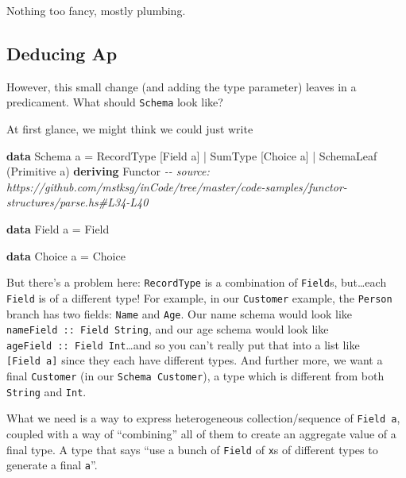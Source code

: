 \documentclass[]{article}
\newenvironment{Shaded}{}{}
\newcommand{\CommentTok}[1]{\textcolor[rgb]{0.38,0.63,0.69}{\textit{#1}}}
\newcommand{\DataTypeTok}[1]{\textcolor[rgb]{0.56,0.13,0.00}{#1}}
\newcommand{\KeywordTok}[1]{\textcolor[rgb]{0.00,0.44,0.13}{\textbf{#1}}}
\newcommand{\NormalTok}[1]{#1}
\newcommand{\OperatorTok}[1]{\textcolor[rgb]{0.40,0.40,0.40}{#1}}
\newcommand{\OtherTok}[1]{\textcolor[rgb]{0.00,0.44,0.13}{#1}}
\begin{document}
Nothing too fancy, mostly plumbing.

\hypertarget{deducing-ap}{%
\subsection{Deducing Ap}\label{deducing-ap}}

However, this small change (and adding the type parameter) leaves in a
predicament. What should \texttt{Schema} look like?

At first glance, we might think we could just write

\begin{Shaded}
\begin{Highlighting}[]
\KeywordTok{data} \DataTypeTok{Schema}\NormalTok{ a }\OtherTok{=}
      \DataTypeTok{RecordType}\NormalTok{  [}\DataTypeTok{Field}\NormalTok{ a]}
    \OperatorTok{|} \DataTypeTok{SumType}\NormalTok{     [}\DataTypeTok{Choice}\NormalTok{ a]}
    \OperatorTok{|} \DataTypeTok{SchemaLeaf}\NormalTok{  (}\DataTypeTok{Primitive}\NormalTok{ a)}
  \KeywordTok{deriving} \DataTypeTok{Functor}
\CommentTok{{-}{-} source: https://github.com/mstksg/inCode/tree/master/code{-}samples/functor{-}structures/parse.hs\#L34{-}L40}

\KeywordTok{data} \DataTypeTok{Field}\NormalTok{ a }\OtherTok{=} \DataTypeTok{Field}

\KeywordTok{data} \DataTypeTok{Choice}\NormalTok{ a }\OtherTok{=} \DataTypeTok{Choice}
\end{Highlighting}
\end{Shaded}

But there's a problem here: \texttt{RecordType} is a combination of
\texttt{Field}s, but\ldots each \texttt{Field} is of a different type! For
example, in our \texttt{Customer} example, the \texttt{Person} branch has two
fields: \texttt{Name} and \texttt{Age}. Our name schema would look like
\texttt{nameField\ ::\ Field\ String}, and our age schema would look like
\texttt{ageField\ ::\ Field\ Int}\ldots and so you can't really put that into a
list like \texttt{{[}Field\ a{]}} since they each have different types. And
further more, we want a final \texttt{Customer} (in our
\texttt{Schema\ Customer}), a type which is different from both \texttt{String}
and \texttt{Int}.

What we need is a way to express heterogeneous collection/sequence of
\texttt{Field\ a}, coupled with a way of ``combining'' all of them to create an
aggregate value of a final type. A type that says ``use a bunch of
\texttt{Field} of \texttt{x}s of different types to generate a final
\texttt{a}''.
\end{document}
